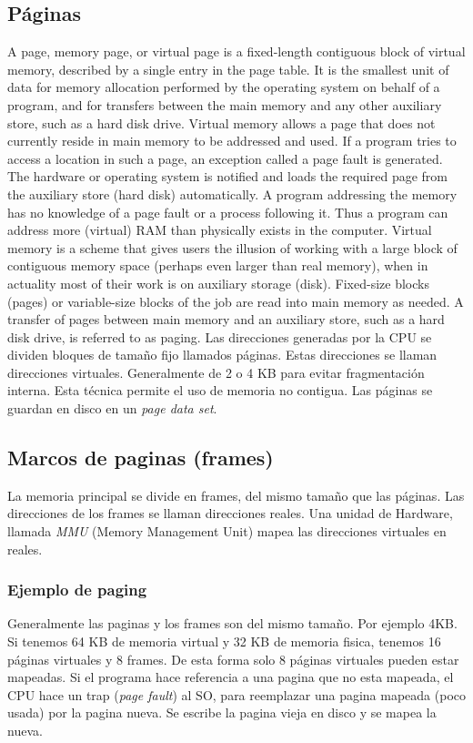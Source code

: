 \documentclass[a4paper, twoside]{article}
\begin{document}
\subsection{Páginas}
A page, memory page, or virtual page is a fixed-length contiguous block of virtual memory, described by a single entry in the page table. It is the smallest unit of data for memory allocation performed by the operating system on behalf of a program, and for transfers between the main memory and any other auxiliary store, such as a hard disk drive.
Virtual memory allows a page that does not currently reside in main memory to be addressed and used. If a program tries to access a location in such a page, an exception called a page fault is generated. The hardware or operating system is notified and loads the required page from the auxiliary store (hard disk) automatically. A program addressing the memory has no knowledge of a page fault or a process following it. Thus a program can address more (virtual) RAM than physically exists in the computer. Virtual memory is a scheme that gives users the illusion of working with a large block of contiguous memory space (perhaps even larger than real memory), when in actuality most of their work is on auxiliary storage (disk). Fixed-size blocks (pages) or variable-size blocks of the job are read into main memory as needed.
A transfer of pages between main memory and an auxiliary store, such as a hard disk drive, is referred to as paging.
Las direcciones generadas por la CPU se dividen bloques de tamaño fijo llamados páginas.
Estas direcciones se llaman direcciones virtuales. 
Generalmente de 2 o 4 KB para evitar fragmentación interna.
Esta técnica permite el uso de memoria no contigua.
Las páginas se guardan en disco en un \emph{page data set}.

\subsection{Marcos de paginas (frames)}
La memoria principal se divide en frames, del mismo tamaño que las páginas.
Las direcciones de los frames se llaman direcciones reales.
Una unidad de Hardware, llamada \emph{MMU} (Memory Management Unit) mapea las direcciones virtuales en reales.

\subsubsection{Ejemplo de paging}
Generalmente las paginas y los frames son del mismo tamaño. Por ejemplo 4KB.
Si tenemos 64 KB de memoria virtual y 32 KB de memoria fisica, tenemos 16 páginas virtuales y 8 frames. De esta forma solo 8 páginas virtuales pueden estar mapeadas. Si el programa hace referencia a una pagina que no esta mapeada, el CPU hace un trap (\emph{page fault}) al SO, para reemplazar una pagina mapeada (poco usada) por la pagina nueva. Se escribe la pagina vieja en disco y se mapea la nueva.
\end{document}
